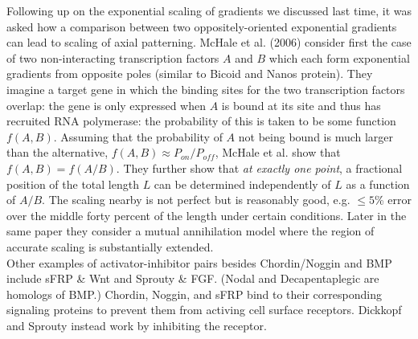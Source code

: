 \documentclass{article}
\begin{document}
Following up on the exponential scaling of gradients we discussed last time, it was asked how a comparison between two oppositely-oriented exponential gradients can lead to scaling of axial patterning. McHale et al. (2006) consider first the case of two non-interacting transcription factors $A$ and $B$ which each form exponential gradients from opposite poles (similar to Bicoid and Nanos protein). They imagine a target gene in which the binding sites for the two transcription factors overlap: the gene is only expressed when $A$ is bound at its site and thus has recruited RNA polymerase:  the probability of this is taken to be some function $f(A,B)$. Assuming that the probability of $A$ not being bound is much larger than the alternative, $f(A,B) \approx P_{on}/P_{off}$, McHale et al. show that $f(A,B) = f(A/B)$. They further show that \textit{at exactly one point}, a fractional position of the total length $L$ can be determined independently of $L$ as a function of $A/B$. The scaling nearby is not perfect but  is reasonably good, e.g. $\leq 5$\% error over the middle forty percent of the length under certain conditions. Later in the same paper they consider a mutual annihilation model where the region of accurate scaling is substantially extended.\\

Other examples of activator-inhibitor pairs besides Chordin/Noggin and BMP include sFRP \& Wnt and Sprouty \& FGF. (Nodal and Decapentaplegic are homologs of BMP.) Chordin, Noggin, and sFRP bind to their corresponding signaling proteins to prevent them from activing cell surface receptors. Dickkopf and Sprouty instead work by inhibiting the receptor.
\end{document}
